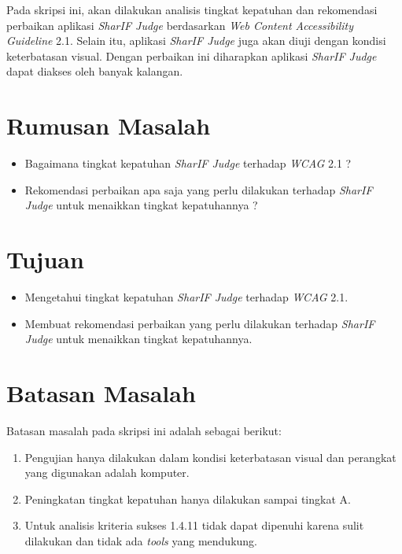 Pada skripsi ini, akan dilakukan analisis tingkat kepatuhan dan rekomendasi perbaikan aplikasi \textit{SharIF Judge} berdasarkan \textit{Web Content Accessibility Guideline} 2.1. Selain itu, aplikasi \textit{SharIF Judge} juga akan diuji dengan kondisi keterbatasan visual. Dengan perbaikan ini diharapkan aplikasi \textit{SharIF Judge} dapat diakses oleh banyak kalangan.

\section{Rumusan Masalah}
\label{sec:rumusan}
\begin{itemize}
	\item Bagaimana tingkat kepatuhan \textit{SharIF Judge} terhadap \textit{WCAG} 2.1 ?
	\item Rekomendasi perbaikan apa saja yang perlu dilakukan terhadap \textit{SharIF Judge} untuk menaikkan tingkat kepatuhannya ?
\end{itemize}

\section{Tujuan}
\label{sec:tujuan}
\begin{itemize}
	\item Mengetahui tingkat kepatuhan \textit{SharIF Judge} terhadap \textit{WCAG} 2.1.
	\item Membuat rekomendasi perbaikan yang perlu dilakukan terhadap \textit{SharIF Judge} untuk menaikkan tingkat kepatuhannya.
\end{itemize} 

\section{Batasan Masalah}
\label{sec:batasan}
Batasan masalah pada skripsi ini adalah sebagai berikut:

\begin{enumerate}
	\item Pengujian hanya dilakukan dalam kondisi keterbatasan visual dan perangkat yang digunakan adalah komputer.
	\item Peningkatan tingkat kepatuhan hanya dilakukan sampai tingkat A.
	\item Untuk analisis kriteria sukses 1.4.11 tidak dapat dipenuhi karena sulit dilakukan dan tidak ada \textit{tools} yang mendukung.
\end{enumerate}

